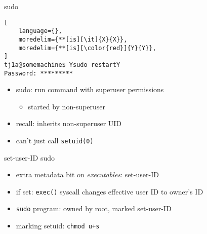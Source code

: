 \begin{frame}[fragile,label=sudoEx]{sudo}
\begin{lstlisting}[
    language={},
    moredelim={**[is][\it]{X}{X}},
    moredelim={**[is][\color{red}]{Y}{Y}},
]
tj1a@somemachine$ Ysudo restartY
Password: *********
\end{lstlisting}
\begin{itemize}
\item sudo: run command with superuser permissions
    \begin{itemize}
    \item started by non-superuser
    \end{itemize}
\item recall: inherits non-superuser UID
\item can't just call \texttt{setuid(0)}
\end{itemize}
\end{frame}

\begin{frame}{set-user-ID sudo}
\begin{itemize}
\item extra metadata bit on \textit{executables}: set-user-ID
\item if set: \texttt{exec()} syscall changes effective user ID to owner's ID
\item \texttt{sudo} program: owned by root, marked set-user-ID
\vspace{.5cm}
\item marking setuid: \texttt{chmod u+s}
\end{itemize}
\end{frame}

